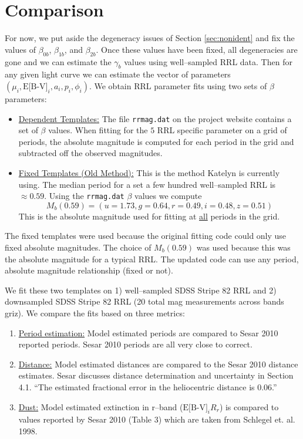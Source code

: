 \documentclass[12pt]{article}
\begin{document}
\section{Comparison}
\label{sec:compare}

For now, we put aside the degeneracy issues of Section \ref{sec:nonident} and fix the values of $\beta_{0b}$, $\beta_{1b}$, and $\beta_{2b}$. Once these values have been fixed, all degeneracies are gone and we can estimate the $\gamma_b$ values using well--sampled RRL data. Then for any given light curve we can estimate the vector of parameters $(\mu_i,\text{E[B-V]}_i,a_i,p_i,\phi_i)$. We obtain RRL parameter fits using two sets of $\beta$ parameters:
\begin{itemize}
\item \underline{Dependent Templates:} The file \texttt{rrmag.dat} on the project website contains a set of $\beta$ values. When fitting for the $5$ RRL specific parameter on a grid of periods, the absolute magnitude is computed for each period in the grid and subtracted off the observed magnitudes.
\item \underline{Fixed Templates (Old Method):} This is the method Katelyn is currently using. The median period for a set a few hundred well--sampled RRL is $\approx 0.59$. Using the \texttt{rrmag.dat} $\beta$ values we compute
  \begin{equation*}
    M_b(0.59) = (u=1.73,g=0.64,r=0.49,i=0.48,z=0.51)
  \end{equation*}
  This is the absolute magnitude used for fitting at \underline{all} periods in the grid.
\end{itemize}
The fixed templates were used because the original fitting code could only use fixed absolute magnitudes. The choice of $M_b(0.59)$ was used because this was the absolute magnitude for a typical RRL. The updated code can use any period, absolute magnitude relationship (fixed or not).

We fit these two templates on 1) well--sampled SDSS Stripe 82 RRL and 2) downsampled SDSS Stripe 82 RRL (20 total mag measurements across bands griz). We compare the fits based on three metrics:
\begin{enumerate}
\item \underline{Period estimation:} Model estimated periods are compared to Sesar 2010 reported periods. Sesar 2010 periods are all very close to correct.
\item \underline{Distance:} Model estimated distances are compared to the Sesar 2010 distance estimates. Sesar discusses distance determination and uncertainty in Section 4.1. ``The estimated fractional error in the heliocentric distance is 0.06.''
\item \underline{Dust:} Model estimated extinction in r--band ($\text{E[B-V]}_iR_r$) is compared to values reported by Sesar 2010 (Table 3) which are taken from Schlegel et. al. 1998.
\end{enumerate}
\end{document}
